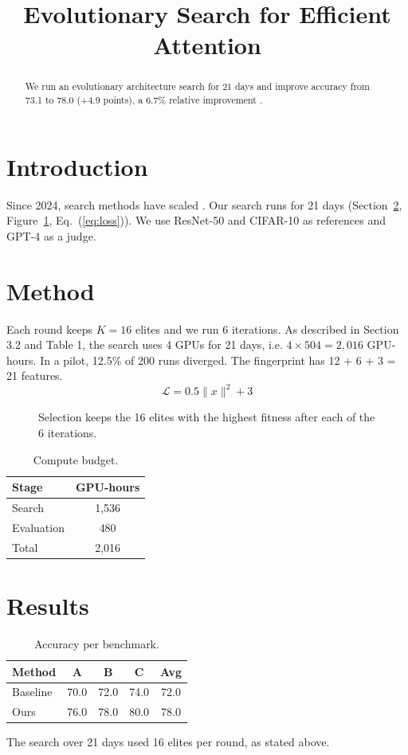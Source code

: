 \documentclass{article}
\title{Evolutionary Search for Efficient Attention}
\begin{document}
\maketitle
\begin{abstract}
We run an evolutionary architecture search for 21 days and improve accuracy from 73.1 to 78.0 (+4.9 points), a 6.7\% relative improvement \citep{smith2024,lee2023}.
\end{abstract}

\section{Introduction}
Since 2024, search methods have scaled \cite{lee2023}. Our search runs for 21 days (Section~\ref{sec:method}, Figure~\ref{fig:a}, Eq.~(\ref{eq:loss})). We use ResNet-50 and CIFAR-10 as references and GPT-4 as a judge.

\section{Method}
\label{sec:method}
Each round keeps $K = 16$ elites and we run 6 iterations. As described in Section 3.2 and Table 1, the search uses 4 GPUs for 21 days, i.e. $4 \times 504 = 2{,}016$ GPU-hours. In a pilot, 12.5\% of 200 runs diverged. The fingerprint has 12 + 6 + 3 = 21 features.
\begin{equation}
\mathcal{L} = 0.5 \|x\|^2 + 3 \label{eq:loss}
\end{equation}

\begin{figure}[t]
\caption{Selection keeps the 16 elites with the highest fitness after each of the 6 iterations.}
\label{fig:a}
\end{figure}

\begin{table}[t]
\caption{Compute budget.}
\begin{tabular}{lc}
\toprule
Stage & GPU-hours \\
\midrule
Search & 1,536 \\
Evaluation & 480 \\
Total & 2,016 \\
\bottomrule
\end{tabular}
\end{table}

\section{Results}
\begin{table}[t]
\caption{Accuracy per benchmark.}
\begin{tabular}{lcccc}
\toprule
Method & A & B & C & Avg \\
\midrule
Baseline & 70.0 & 72.0 & 74.0 & 72.0 \\
Ours & 76.0 & 78.0 & 80.0 & 78.0 \\
\bottomrule
\end{tabular}
\end{table}
The search over 21 days used 16 elites per round, as stated above.
\end{document}
